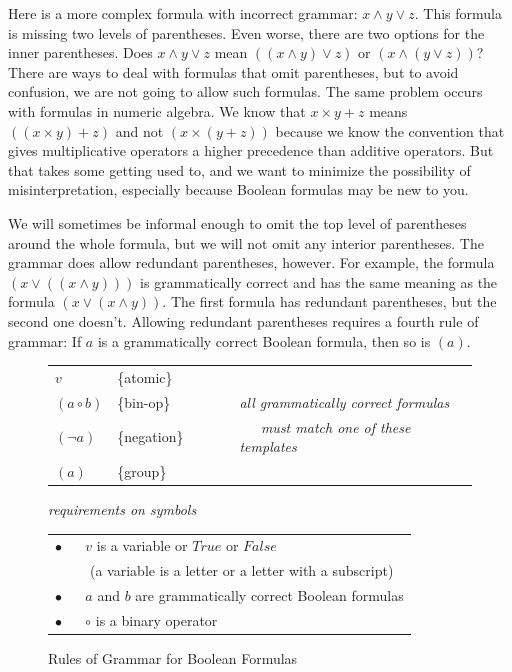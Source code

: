 Here is a more complex formula with incorrect grammar:
$x \wedge y \vee z$. This formula is missing two levels of parentheses.
Even worse, there are two options for the inner parentheses.
Does $x \wedge y \vee z$ mean $((x \wedge y) \vee z)$ or $(x \wedge (y \vee z))$?
There are ways to deal with formulas that omit parentheses,
but to avoid confusion, we are not going to allow such formulas.
The same problem occurs with formulas in numeric algebra.
We know that $x \times y + z$ means $((x \times y) + z)$ and
not $(x \times (y + z))$ because we know the convention that
gives multiplicative operators a higher precedence than additive operators.
But that takes some getting used to, and we want to
minimize the possibility of misinterpretation,
especially because Boolean formulas may be new to you.

We will sometimes be informal enough to omit
the top level of parentheses around the whole formula,
but we will not omit any interior parentheses.
The grammar does allow redundant parentheses, however.
For example, the formula $(x \vee ((x \wedge y)))$
is grammatically correct and has the same meaning as the formula
$(x \vee (x \wedge y))$.
The first formula has redundant parentheses,
but the second one doesn't.
Allowing redundant parentheses requires a fourth rule of grammar:
If $a$ is a grammatically correct Boolean formula, then so is $(a)$.

\begin{figure}
\begin{center}
\begin{tabular}{llll}
$v$             & \{atomic\}    &~~~~& \\
$(a \circ b)$   & \{bin-op\}    &~~~~& \emph{all grammatically correct formulas} \\
$(\neg a)$      & \{negation\}  &~~~~& \emph{~~~must match one of these templates}  \\
$(a)$           & \{group\}     &~~~~& \\
\end{tabular}

\vspace{2 mm}

\emph{requirements on symbols}

\begin{tabular}{l}
\hline
$\bullet$ ~~ $v$ is a variable or $True$ or $False$ \\
~~~~~(a variable is a letter or a letter with a subscript) \\
$\bullet$ ~~ $a$ and $b$ are grammatically correct Boolean formulas \\
$\bullet$ ~~ $\circ$ is a binary operator \\
\hline
\end{tabular}
\end{center}
\caption{Rules of Grammar for Boolean Formulas}
\label{fig-02-grammar}
\end{figure}

